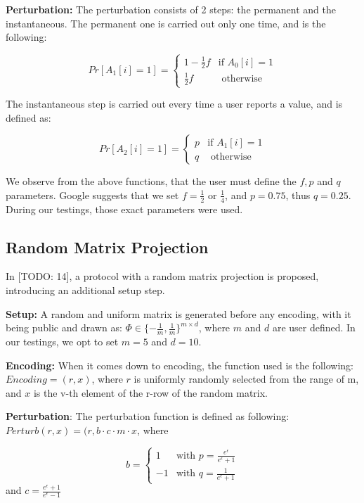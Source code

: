 \textbf{Perturbation:} The perturbation consists of 2 steps: the permanent and the instantaneous. The permanent one is carried out only one time, and is the following: 

\begin{equation*}
    Pr[A_1[i] = 1] =
	\begin{cases}
		1 - \frac{1}{2}f & \mbox{if } A_0[i]=1 \\
		\frac{1}{2}f & \mbox{ otherwise}
			\end{cases}
\end{equation*}

The instantaneous step is carried out every time a user reports a value, and is defined as:

\begin{equation*}
    Pr[A_2[i] = 1] =
	\begin{cases}
		p & \mbox{if } A_1[i]=1 \\
		q & \mbox{ otherwise}
			\end{cases}
\end{equation*}

We observe from the above functions, that the user must define the $f, p $ and $q$ parameters. Google suggests that we set $f = \frac{1}{2}$ or $\frac{1}{4}$, and $p = 0.75$, thus $q = 0.25$. During our testings, those exact parameters were used. 


\subsection{Random Matrix Projection}
In [TODO: 14], a protocol with a random matrix projection is proposed, introducing an additional setup step.

\textbf{Setup:} A random and uniform matrix is generated before any encoding, with it being public and drawn as: $\Phi \in \{-\frac{1}{m}, \frac{1}{m}\}^{m \times d}$, where $m$ and $d$ are user defined. In our testings, we opt to set $m = 5$ and $d = 10$.

\textbf{Encoding:} When it comes down to encoding, the function used is the following: $Encoding = (r,x)$, where $r$ is uniformly randomly selected from the range of m, and $x$ is the v-th element of the r-row of the random matrix.

\textbf{Perturbation}: The perturbation function is defined as following: $Perturb(r,x) = (r, b\cdot c \cdot m \cdot x$, where 

\begin{equation*}
    b =
	\begin{cases}
		1 & \mbox{with } p = \frac{e^\epsilon}{e^\epsilon + 1} \\
		-1 & \mbox{with } q = \frac{1}{e^\epsilon + 1}			
	\end{cases}
\end{equation*}
and $c = \frac{e^\epsilon +1}{e^\epsilon -1}$

